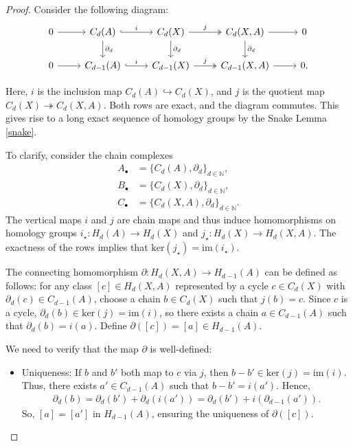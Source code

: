 \begin{proof}
	Consider the following diagram:
	\begin{equation}
		\begin{tikzcd}
			0 \arrow[r] & C_d(A) \arrow[r, "i", hook] \arrow[d, "\partial_d"] & C_d(X) \arrow[r, "j", two heads] \arrow[d, "\partial_d"] & C_d(X, A) \arrow[r] \arrow[d, "\partial_d"] & 0 \\
			0 \arrow[r] & C_{d-1}(A) \arrow[r, "i", hook] & C_{d-1}(X) \arrow[r, "j", two heads] & C_{d-1}(X, A) \arrow[r] & 0.
		\end{tikzcd}
	\end{equation}
			
	Here, \(i\) is the inclusion map \(C_{d}(A) \hookrightarrow C_{d}(X)\), and \(j\) is the quotient map \(C_{d}(X) \twoheadrightarrow C_{d}(X, A)\). Both rows are exact, and the diagram commutes. This gives rise to a long exact sequence of homology groups by the Snake Lemma \ref{snake}.
			
	To clarify, consider the chain complexes
	\begin{align}
		A_{\bullet} & = \{C_{d}(A), \partial_{d}\}_{d \in \mathbb{N}},    \\
		B_{\bullet} & = \{C_{d}(X), \partial_{d}\}_{d \in \mathbb{N}},    \\
		C_{\bullet} & = \{C_{d}(X, A), \partial_{d}\}_{d \in \mathbb{N}}. 
	\end{align}
	The vertical maps \(i\) and \(j\) are chain maps and thus induce homomorphisms on homology groups \(i_{\star}: H_{d}(A) \rightarrow H_{d}(X)\) and \(j_{\star}: H_{d}(X) \rightarrow H_{d}(X, A)\). The exactness of the rows implies that \(\mathrm{ker}(j_{\star}) = \mathrm{im}(i_{\star})\).
			
	The connecting homomorphism \(\partial: H_{d}(X, A) \rightarrow H_{d-1}(A)\) can be defined as follows: for any class \([c] \in H_{d}(X, A)\) represented by a cycle \(c \in C_{d}(X)\) with \(\partial_{d}(c) \in C_{d-1}(A)\), choose a chain \(b \in C_{d}(X)\) such that \(j(b) = c\). Since \(c\) is a cycle, \(\partial_{d}(b) \in \mathrm{ker}(j) = \mathrm{im}(i)\), so there exists a chain \(a \in C_{d-1}(A)\) such that \(\partial_{d}(b) = i(a)\). Define \(\partial([c]) = [a] \in H_{d-1}(A)\).
			
	We need to verify that the map \(\partial\) is well-defined:
	\begin{itemize}
		\item Uniqueness: If \(b\) and \(b'\) both map to \(c\) via \(j\), then \(b - b' \in \mathrm{ker}(j) = \mathrm{im}(i)\). Thus, there exists \(a' \in C_{d-1}(A)\) such that \(b - b' = i(a')\). Hence,
		      \begin{align}
		      	\partial_{d}(b) = \partial_{d}(b') + \partial_{d}(i(a')) = \partial_{d}(b') + i(\partial_{d-1}(a')). 
		      \end{align}
		      So, \([a] = [a']\) in \(H_{d-1}(A)\), ensuring the uniqueness of \(\partial([c])\).
		      		      		      

\end{itemize}
\end{proof}
